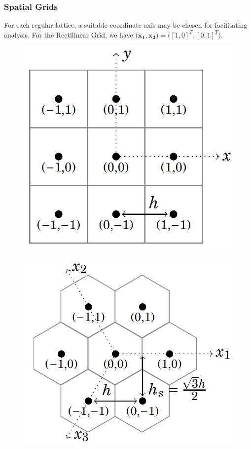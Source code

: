 \documentclass{beamer}
\begin{document}

\begin{frame}
\frametitle{Spatial Grids}

For each regular lattice, a suitable coordinate axis may be chosen for facilitating analysis. 
For the Rectilinear Grid, we have $\big( \mathbf{x_1}, \mathbf{x_2} \big) = \big([1,0]^T, [0,1]^T \big)$.
\begin{figure}
\centering
\begin{minipage}{.5\textwidth}
  \centering
\includegraphics[scale=0.2]{./images/jpgRect.jpg}
\label{fig:RectilinearGrid}
\end{minipage}%
\begin{minipage}{.5\textwidth}
  \centering
\includegraphics[scale=0.2]{./images/jpgHex.jpg}
\label{fig:HexGrid}\
\end{minipage}



\end{figure}
\end{frame}
\end{document}
